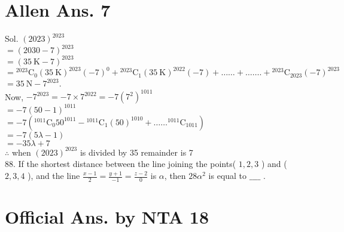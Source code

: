 \documentclass[10pt]{article}
\begin{document}
\section*{Allen Ans. 7}
Sol. \((2023)^{2023}\)\\
\(=(2030-7)^{2023}\)\\
\(=(35 \mathrm{~K}-7)^{2023}\)\\
\(={ }^{2023} \mathrm{C}_{0}(35 \mathrm{~K})^{2023}(-7)^{0}+{ }^{2023} \mathrm{C}_{1}(35 \mathrm{~K})^{2022}(-7)+ \ldots \ldots+\ldots \ldots .+{ }^{2023} \mathrm{C}_{2023}(-7)^{2023}\)\\
\(=35 \mathrm{~N}-7^{2023}\).\\
Now, \(-7^{2023}=-7 \times 7^{2022}=-7\left(7^{2}\right)^{1011}\)\\
\(=-7(50-1)^{1011}\)\\
\(=-7\left({ }^{1011} \mathrm{C}_{0} 50^{1011}-{ }^{1011} \mathrm{C}_{1}(50)^{1010}+\ldots \ldots{ }^{1011} \mathrm{C}_{1011}\right)\)\\
\(=-7(5 \lambda-1)\)\\
\(=-35 \lambda+7\)\\
\(\therefore\) when \((2023)^{2023}\) is divided by 35 remainder is 7\\
88. If the shortest distance between the line joining the points( \(1,2,3\) ) and ( \(2,3,4\) ), and the line \(\frac{x-1}{2}=\frac{y+1}{-1}=\frac{z-2}{0}\) is \(\alpha\), then \(28 \alpha^{2}\) is equal to \(\_\_\_\_\) .

\section*{Official Ans. by NTA 18}
\end{document}
